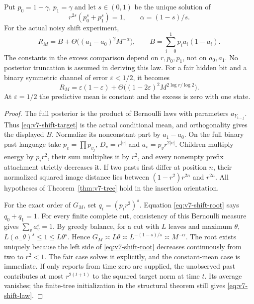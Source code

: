 \begin{theorem}
\label{thm:v7-shift}
Put $p_0=1-\gamma$, $p_1=\gamma$ and let $s\in(0,1)$ be the unique
solution of
\begin{equation}
            r^{2s}(p_0^s+p_1^s)=1,
       \qquad \alpha=(1-s)/s.                           \label{eq:v7-shift-root}
\end{equation}
For the actual noisy shift experiment,
\begin{equation}
 R_M=B+\Theta\bigl((a_1-a_0)^2M^{-\alpha}\bigr),\qquad
 B=\sum_{i=0}^1p_i a_i(1-a_i).                          \label{eq:v7-shift-law}
\end{equation}
The constants in the excess comparison depend on $r,p_0,p_1$, not on
$a_0,a_1$. No posterior truncation is assumed in deriving this law.
For a fair hidden bit and a binary symmetric channel of error
$\varepsilon<1/2$, it becomes
\[
 R_M=\varepsilon(1-\varepsilon)
    +\Theta\bigl((1-2\varepsilon)^2M^{2\log r/\log2}\bigr).
\]
At $\varepsilon=1/2$ the predictive mean is constant and the excess is
zero with one state.
\end{theorem}
\begin{proof}
The full posterior is the product of Bernoulli laws with parameters
$a_{Y_{t-j}}$. Thus \eqref{eq:v7-shift-target} is the actual conditional
mean, and orthogonality gives the displayed $B$. Normalize its
nonconstant part by $a_1-a_0$. On the full binary past language take
$p_v=\prod p_{v_j}$, $D_v=r^{|v|}$ and $a_v=p_vr^{2|v|}$.
Children multiply energy by $p_i r^2$, their sum multiplies it by $r^2$,
and every nonempty prefix attachment strictly decreases it. If two
pasts first differ at position $n$, their normalized squared image
distance lies between $(1-r^2)r^{2n}$ and $r^{2n}$. All hypotheses of
Theorem~\ref{thm:v7-tree} hold in the insertion orientation.

For the exact order of $G_M$, set $q_i=(p_ir^2)^s$. Equation
\eqref{eq:v7-shift-root} says $q_0+q_1=1$. For every finite complete
cut, consistency of this Bernoulli measure gives $\sum_v a_v^s=1$.
By greedy balance, for a cut with $L$ leaves and maximum $\theta$,
$L(a_-\theta)^s\le1\le L\theta^s$.
Hence $G_M\asymp L\theta\asymp L^{-(1-s)/s}\asymp M^{-\alpha}$.
The root exists uniquely because the left side of
\eqref{eq:v7-shift-root} decreases continuously from two to $r^2<1$.
The fair case solves it explicitly, and the constant-mean case is
immediate. If only reports from time zero are supplied, the unobserved
past contributes at most $r^{2(t+1)}$ to the squared target norm at
time $t$. Its average vanishes; the finite-tree initialization in the
structural theorem still gives \eqref{eq:v7-shift-law}.
\end{proof}

